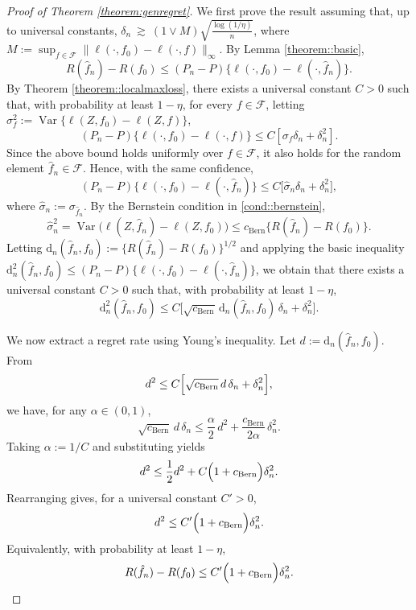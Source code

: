 \documentclass[10pt,a4paper]{amsart}
\newcommand{\Var}{\operatorname{Var}}
\begin{document}
\begin{proof}[Proof of Theorem \ref{theorem:genregret}]
We first prove the result assuming that, up to universal constants,
$\delta_n \ \gtrsim\ (1 \vee M)\sqrt{\frac{\log(1/\eta)}{n}}$, where
$M :=  \sup_{f \in \mathcal{F}} \|\ell(\cdot, f_0) - \ell(\cdot, f)\|_{\infty}$. By Lemma \ref{theorem::basic},
\[
R(\hat f_n)-R(f_0) \le (P_n-P)\bigl\{\ell(\cdot,f_0)-\ell(\cdot,\hat f_n)\bigr\}.
\]
By Theorem \ref{theorem::localmaxloss}, there exists a universal constant $C>0$ such that, with probability at least $1-\eta$, for every $f\in\mathcal{F}$,
letting $\sigma_f^2 := \Var\{\ell(Z, f_0) - \ell(Z, f)\}$,
\[
(P_n-P) \{\ell(\cdot, f_0) - \ell(\cdot, f)\}
\le
C\left[
\sigma_f\delta_n
+
\delta_n^2
\right].
\]
Since the above bound holds uniformly over $f \in \mathcal{F}$, it also holds for the random element
$\hat{f}_n \in \mathcal{F}$. Hence, with the same confidence,
\[
(P_n-P) \{\ell(\cdot, f_0) - \ell(\cdot, \hat f_n)\}
\le
C\Biggl[
\hat{\sigma}_n \delta_n
+
\delta_n^2
\Biggr],
\]
where $\hat{\sigma}_n := \sigma_{\hat f_n}$. By the Bernstein condition in \ref{cond::bernstein},
\[
\hat{\sigma}_n^2
=
\Var\bigl(\ell(Z,\hat f_n)-\ell(Z,f_0)\bigr)
\le
c_{\mathrm{Bern}}\{R(\hat f_n)-R(f_0)\}.
\]
Letting $\mathrm{d}_n(\hat f_n, f_0) := \{R(\hat f_n) - R(f_0)\}^{1/2}$ and applying the basic
inequality $\mathrm{d}_n^2(\hat f_n, f_0) \le (P_n-P)\{\ell(\cdot, f_0) - \ell(\cdot, \hat f_n)\}$,
we obtain that there exists a universal constant $C>0$ such that, with probability at least $1-\eta$,
\begin{equation}
\label{eqn::proofcriticalineq}
\mathrm{d}_n^2(\hat f_n, f_0)
\le
C\Biggl[
\sqrt{c_{\mathrm{Bern}}}\,\mathrm{d}_n(\hat f_n, f_0)\,\delta_n
+
\delta_n^2
\Biggr].
\end{equation}

We now extract a regret rate using Young's inequality. Let
\(d := \mathrm{d}_n(\hat f_n,f_0)\). From
\[
d^2 \le C\Bigl[\sqrt{c_{\mathrm{Bern}}}\,d\,\delta_n + \delta_n^2\Bigr],
\]
we have, for any \(\alpha\in(0,1)\),
\[
\sqrt{c_{\mathrm{Bern}}}\,d\,\delta_n
\le
\frac{\alpha}{2}\,d^2
+
\frac{c_{\mathrm{Bern}}}{2\alpha}\,\delta_n^2.
\]
Taking \(\alpha := 1/C\) and substituting yields
\[
d^2
\le
\frac{1}{2}d^2
+
C\Bigl(1+c_{\mathrm{Bern}}\Bigr)\delta_n^2.
\]
Rearranging gives, for a universal constant \(C'>0\),
\[
d^2
\le
C'\Bigl(1+c_{\mathrm{Bern}}\Bigr)\delta_n^2.
\]
Equivalently, with probability at least \(1-\eta\),
\[
R(\hat f_n)-R(f_0)
\le
C'\Bigl(1+c_{\mathrm{Bern}}\Bigr)\delta_n^2.
\]


\end{proof}
\end{document}
